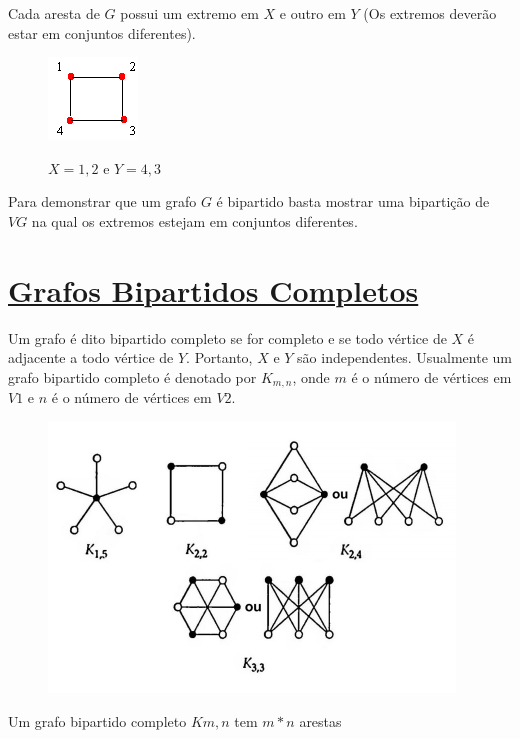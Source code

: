 \documentclass{article}
\begin{document}
		Cada aresta de $G$ possui um extremo em $X$ e outro em $Y$ (Os extremos deverão estar em conjuntos diferentes).
		
\begin{figure}[H]
	\centering
	\includegraphics[width=0.2\linewidth]{"Figuras/img1"}
	\label{fig:img1}
	\caption{$X={1,2}$ e $Y={4,3}$}
\end{figure}
	Para demonstrar que um grafo $G$ é bipartido basta mostrar uma bipartição de $VG$ na qual os extremos estejam em conjuntos diferentes. 

	\section{{\Large \underline{Grafos Bipartidos Completos}}}
		Um grafo é dito bipartido completo se for completo e se todo vértice de $X$ é adjacente a todo vértice de $Y$. Portanto, $X$ e $Y$ são independentes. Usualmente um grafo bipartido completo é denotado por $K_{m,n}$, onde $m$ é o número de vértices em $V1$ e $n$ é o número de vértices em $V2$.
		
\begin{figure}[H]
	\centering
	\includegraphics[width=0.5\linewidth]{"Figuras/img2"}
	\label{fig:img2}
	\caption{}
\end{figure}\vspace*{0.3cm}
	Um grafo bipartido completo $Km,n$ tem $m*n$ arestas
	
\end{document}
